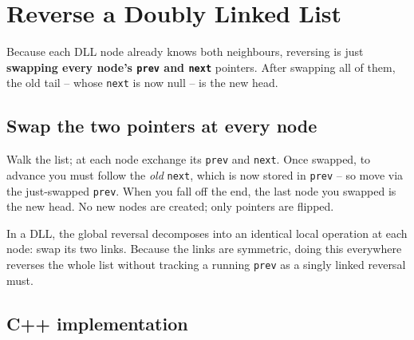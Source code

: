 \section{Reverse a Doubly Linked List}
\label{sec:ll-reverse-dll}


\begin{patternbox}
Because each DLL node already knows both neighbours, reversing is just
\textbf{swapping every node's \texttt{prev} and \texttt{next}} pointers.
After swapping all of them, the old tail -- whose \texttt{next} is now null
-- is the new head.
\end{patternbox}

\subsection*{Swap the two pointers at every node}

Walk the list; at each node exchange its \texttt{prev} and \texttt{next}.
Once swapped, to advance you must follow the \emph{old} \texttt{next}, which
is now stored in \texttt{prev} -- so move via the just-swapped
\texttt{prev}. When you fall off the end, the last node you swapped is the
new head. No new nodes are created; only pointers are flipped.

\begin{ideabox}
In a DLL, the global reversal decomposes into an identical local operation
at each node: swap its two links. Because the links are symmetric, doing
this everywhere reverses the whole list without tracking a running
\texttt{prev} as a singly linked reversal must.
\end{ideabox}

\subsection*{C++ implementation}

